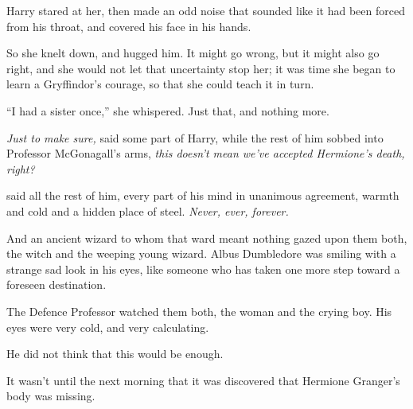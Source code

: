 Harry stared at her, then made an odd noise that sounded like it had been forced from his throat, and covered his face in his hands.

So she knelt down, and hugged him. It might go wrong, but it might also go right, and she would not let that uncertainty stop her; it was time she began to learn a Gryffindor’s courage, so that she could teach it in turn.

“I had a sister once,” she whispered. Just that, and nothing more.

\later

\emph{Just to make sure,} said some part of Harry, while the rest of him sobbed into Professor McGonagall’s arms, \emph{this doesn’t mean we’ve accepted Hermione’s death, right?}

\emph{} said all the rest of him, every part of his mind in unanimous agreement, warmth and cold and a hidden place of steel. \emph{Never, ever, forever.}

\later

And an ancient wizard to whom that ward meant nothing gazed upon them both, the witch and the weeping young wizard. Albus Dumbledore was smiling with a strange sad look in his eyes, like someone who has taken one more step toward a foreseen destination.

\later

The Defence Professor watched them both, the woman and the crying boy. His eyes were very cold, and very calculating.

He did not think that this would be enough.

\later

It wasn’t until the next morning that it was discovered that Hermione Granger’s body was missing.

